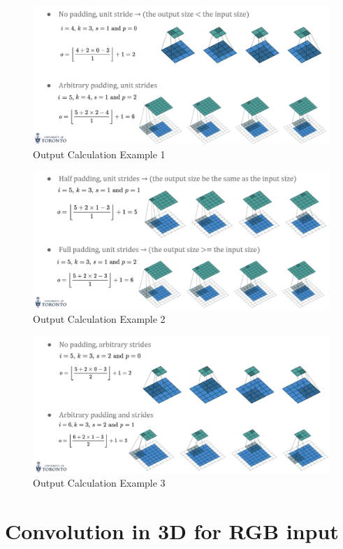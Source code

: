 \begin{figure}[h!t]
    \centering
    \includegraphics[width=0.8\linewidth]{convout1.png}
    \caption{Output Calculation Example 1}
    \label{fig:enter-label}
\end{figure}

\begin{figure}[h!t]
    \centering
    \includegraphics[width=0.8\linewidth]{outconv2.png}
    \caption{Output Calculation Example 2}
    \label{fig:enter-label}
\end{figure}

\begin{figure}[h!t]
    \centering
    \includegraphics[width=0.8\linewidth]{outconv3.png}
        \caption{Output Calculation Example 3}
    \label{fig:enter-label}
\end{figure}

\newpage

\section{Convolution in 3D for RGB input}

